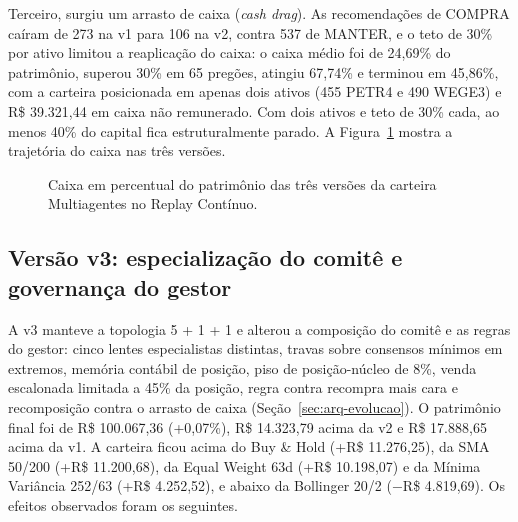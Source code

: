 \documentclass{eic-bcc-tcc}
\begin{document}
Terceiro, surgiu um arrasto de caixa (\textit{cash drag}). As recomendações de COMPRA caíram de 273 na v1 para 106 na v2, contra 537 de MANTER, e o teto de 30\% por ativo limitou a reaplicação do caixa: o caixa médio foi de 24,69\% do patrimônio, superou 30\% em 65 pregões, atingiu 67,74\% e terminou em 45,86\%, com a carteira posicionada em apenas dois ativos (455 PETR4 e 490 WEGE3) e R\$ 39.321,44 em caixa não remunerado. Com dois ativos e teto de 30\% cada, ao menos 40\% do capital fica estruturalmente parado. A Figura~\ref{fig:replay-caixa} mostra a trajetória do caixa nas três versões.

\begin{figure}[htbp]
\centering
{}
\caption{Caixa em percentual do patrimônio das três versões da carteira Multiagentes no Replay Contínuo.}
\label{fig:replay-caixa}
\end{figure}

\subsection{Versão v3: especialização do comitê e governança do gestor}
\label{sec:res-v3}

A v3 manteve a topologia 5 + 1 + 1 e alterou a composição do comitê e as regras do gestor: cinco lentes especialistas distintas, travas sobre consensos mínimos em extremos, memória contábil de posição, piso de posição-núcleo de 8\%, venda escalonada limitada a 45\% da posição, regra contra recompra mais cara e recomposição contra o arrasto de caixa (Seção~\ref{sec:arq-evolucao}). O patrimônio final foi de R\$ 100.067,36 (+0,07\%), R\$ 14.323,79 acima da v2 e R\$ 17.888,65 acima da v1. A carteira ficou acima do Buy \& Hold (+R\$ 11.276,25), da SMA 50/200 (+R\$ 11.200,68), da Equal Weight 63d (+R\$ 10.198,07) e da Mínima Variância 252/63 (+R\$ 4.252,52), e abaixo da Bollinger 20/2 ($-$R\$ 4.819,69). Os efeitos observados foram os seguintes.
\end{document}
